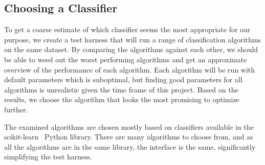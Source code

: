 



\subsection{Choosing a Classifier}\label{choosing_classifier}
To get a coarse estimate of which classifier seems the most appropriate for our purpose, we create a test harness that will run a range of classification algorithms on the same dataset. By comparing the algorithms against each other, we should be able to weed out the worst performing algorithms and get an approximate overview of the performance of each algorithm. Each algorithm will be run with default parameters which is suboptimal, but finding good parameters for all algorithms is unrealistic given the time frame of this project. Based on the results, we choose the algorithm that looks the most promising to optimize further.

The examined algorithms are chosen mostly based on classifiers available in the scikit-learn~\cite{scikit-learn} Python library. There are many algorithms to choose from, and as all the algorithms are in the same library, the interface is the same, significantly simplifying the test harness.

